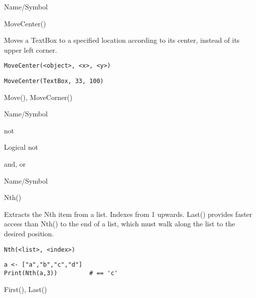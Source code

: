 \rl




\begin{desc}{Name/Symbol}
\item[Name/Symbol]	MoveCenter()

\item[Description]	Moves a TextBox to a specified location
		according to its center, instead of its upper left corner.

\item[Usage]
\begin{verbatim}
MoveCenter(<object>, <x>, <y>)
\end{verbatim}

\item[Example]	
\begin{verbatim}
MoveCenter(TextBox, 33, 100)
\end{verbatim}

\item[See Also]	Move(), MoveCorner()
\end{desc}

\rl


\begin{desc}{Name/Symbol}
\item[Name/Symbol]	not

\item[Description]	Logical not

\item[Usage]		

\item[Example]	

\item[See Also]	and, or
\end{desc}

\rl


\begin{desc}{Name/Symbol}
\item[Name/Symbol]	Nth()

\item[Description]	Extracts the Nth item from a list.  Indexes from 1 upwards.
		Last() provides faster access than Nth() to the end of a list, 
		which must walk along the list to the desired position.

\item[Usage]
\begin{verbatim}
Nth(<list>, <index>)
\end{verbatim}

\item[Example]	
\begin{verbatim}
a <- ["a","b","c","d"]
Print(Nth(a,3)) 		# == 'c'
\end{verbatim}

\item[See Also]	First(), Last() 
\end{desc}

